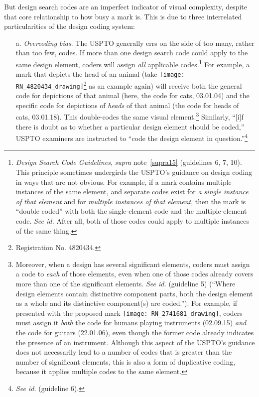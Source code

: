 \documentclass[letterpaper, 11pt, oneside]{article}
\begin{document}
But design search codes are an imperfect indicator of visual complexity, despite that core relationship to how busy a mark is. This is due to three interrelated particularities of the design coding system:

\begin{enumerate}

\item[a.] \textit{Overcoding bias}. The USPTO generally errs on the side of too many, rather than too few, codes. If more than one design search code could apply to the same design element, coders will assign \emph{all} applicable codes.\footnote{\label{supra25} \textit{Design Search Code Guidelines}, \textit{supra} note~\ref{supra15} (guidelines 6, 7, 10). This principle sometimes undergirds the USPTO's guidance on design coding in ways that are not obvious. For example, if a mark contains multiple instances of the same element, and separate codes exist for \emph{a single instance of that element} and for \emph{multiple instances of that element}, then the mark is ``double coded'' with both the single-element code and the multiple-element code. \textit{See id.} After all, both of those codes could apply to multiple instances of the same thing.} For example, a mark that depicts the head of an animal (take \texttt{[image: RN\_4820434\_drawing]}\footnote{Registration No. 4820434.} as an example again) will receive both the general code for depictions of that animal (here, the code for cats, 03.01.04) and the specific code for depictions of \emph{heads} of that animal (the code for heads of cats, 03.01.18). This double-codes the same visual element.\footnote{Moreover, when a design has several significant elements, coders must assign a code to \emph{each} of those elements, even when one of those codes already covers more than one of the significant elements. \textit{See id.} (guideline 5) (``Where design elements contain distinctive component parts, both the design element as a whole and its distinctive component(s) are coded.''). For example, if presented with the proposed mark \texttt{[image: RN\_2741681\_drawing]}, coders must assign it \emph{both} the code for humans playing instruments (02.09.15) \emph{and} the code for guitars (22.01.06), even though the former code already indicates the presence of an instrument. Although this aspect of the USPTO's guidance does not necessarily lead to a number of codes that is greater than the number of significant elements, this is also a form of duplicative coding, because it applies multiple codes to the same element.} Similarly, ``[i]f there is doubt as to whether a particular design element should be coded,'' USPTO examiners are instructed to ``code the design element in question.''\footnote{\textit{See id.} (guideline 6).}


\end{enumerate}
\end{document}
